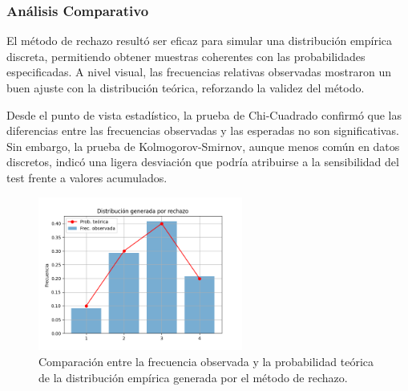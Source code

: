\documentclass{article}
\begin{document}
\subsubsection{Análisis Comparativo}

El método de rechazo resultó ser eficaz para simular una distribución empírica discreta, permitiendo obtener muestras coherentes con las probabilidades especificadas. A nivel visual, las frecuencias relativas observadas mostraron un buen ajuste con la distribución teórica, reforzando la validez del método.

Desde el punto de vista estadístico, la prueba de Chi-Cuadrado confirmó que las diferencias entre las frecuencias observadas y las esperadas no son significativas. Sin embargo, la prueba de Kolmogorov-Smirnov, aunque menos común en datos discretos, indicó una ligera desviación que podría atribuirse a la sensibilidad del test frente a valores acumulados.

\begin{figure}[H]
    \centering
    \includegraphics[width=0.6\textwidth]{visualizaciones/empirica_discreta_rechazo.png}
    \caption{Comparación entre la frecuencia observada y la probabilidad teórica de la distribución empírica generada por el método de rechazo.}
    \label{fig:empirica_rechazo}
\end{figure}
\end{document}
